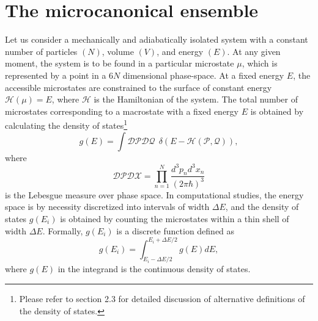 \documentclass[12pt]{report}
\begin{document}
\section{The microcanonical ensemble}
\label{sec:mic_ensemble}
Let us consider a mechanically and adiabatically isolated system with a constant number of particles $(N)$, volume $(V)$, and energy $(E)$. At any given moment, the system is to be found in a particular microstate $\mu$, which is represented by a point in a $6N$ dimensional phase-space. At a fixed energy $E$, the accessible microstates are constrained to the surface of constant energy $\mathcal{H}(\mu) = E$, where $\mathcal{H}$ is the Hamiltonian of the system. The total number of microstates corresponding to a macrostate with a fixed energy $E$ is obtained by calculating the density of states\footnote{Please refer to section 2.3 for detailed discussion of alternative definitions of the density of states.}
\begin{equation}
\label{eq:densityOfStatesTheoretic}
g(E) = \int \mathcal{DP}\mathcal{DQ} \:\: \delta(E - \mathcal{H}(\mathcal{P},\mathcal{Q})),
\end{equation} 
where 
\begin{equation}
\mathcal{DP}\mathcal{DX} = \prod_{n = 1}^{N} \frac{d^{3}p_{n}d^{3}x_{n}}{(2 \pi \hbar)^{3}}
\end{equation}
is the Lebesgue measure over phase space\cite{Rugh2001}. In computational studies, the energy space is by necessity discretized into intervals of width $\Delta E$, and the density of states $g(E_{i})$ is obtained by counting the microstates within a thin shell of width $\Delta E$. Formally, $g(E_{i})$ is a discrete function defined as
\begin{equation}
\label{eq:densitOfStatesExplicit}
g(E_{i}) = \int _{E_{i}-\Delta E/2} ^{E_{i}+\Delta E/2} g(E)dE,
\end{equation}
where $g(E)$ in the integrand is the continuous density of states\cite{Bachmann2014}.
\end{document}
